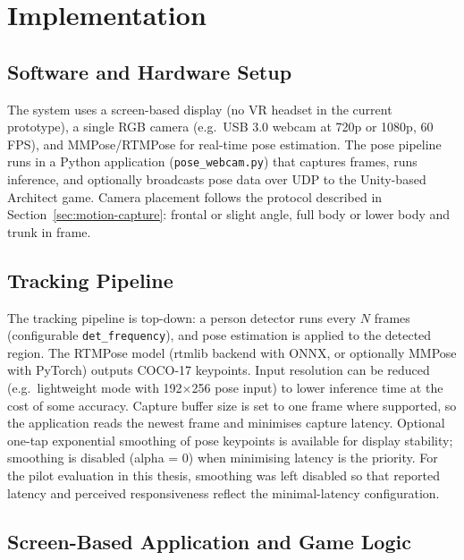 
\chapter{Implementation}\label{ch:implementation}

\section{Software and Hardware Setup}

The system uses a screen-based display (no VR headset in the current prototype), a single RGB camera (e.g.\ USB 3.0 webcam at 720p or 1080p, 60\,FPS), and MMPose/RTMPose for real-time pose estimation. The pose pipeline runs in a Python application (\texttt{pose\_webcam.py}) that captures frames, runs inference, and optionally broadcasts pose data over UDP to the Unity-based Architect game. Camera placement follows the protocol described in Section~\ref{sec:motion-capture}: frontal or slight angle, full body or lower body and trunk in frame.

\section{Tracking Pipeline}

The tracking pipeline is top-down: a person detector runs every $N$ frames (configurable \texttt{det\_frequency}), and pose estimation is applied to the detected region. The RTMPose model (rtmlib backend with ONNX, or optionally MMPose with PyTorch) outputs COCO-17 keypoints. Input resolution can be reduced (e.g.\ lightweight mode with 192$\times$256 pose input) to lower inference time at the cost of some accuracy. Capture buffer size is set to one frame where supported, so the application reads the newest frame and minimises capture latency. Optional one-tap exponential smoothing of pose keypoints is available for display stability; smoothing is disabled (alpha = 0) when minimising latency is the priority. For the pilot evaluation in this thesis, smoothing was left disabled so that reported latency and perceived responsiveness reflect the minimal-latency configuration.

\section{Screen-Based Application and Game Logic}

